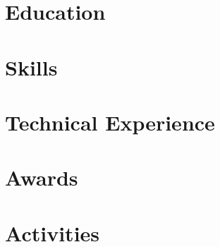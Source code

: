\documentclass[letter,10pt]{article}
\begin{document}



\section{Education}


\section{Skills}


\section{Technical Experience}


\section{Awards}




\section{Activities}

\end{document}
